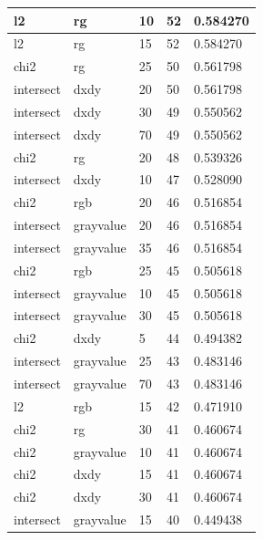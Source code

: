 \documentclass{article}
\begin{document}
\begin{longtable}{|l|l|l|l|l|}
    l2            & rg             & 10       & 52      & 0.584270 \\ \hline 
    l2            & rg             & 15       & 52      & 0.584270 \\ \hline
    chi2          & rg             & 25       & 50      & 0.561798 \\ \hline
    intersect     & dxdy           & 20       & 50      & 0.561798 \\ \hline
    intersect     & dxdy           & 30       & 49      & 0.550562 \\ \hline
    intersect     & dxdy           & 70       & 49      & 0.550562 \\ \hline
    chi2          & rg             & 20       & 48      & 0.539326 \\ \hline
    intersect     & dxdy           & 10       & 47      & 0.528090 \\ \hline
    chi2          & rgb            & 20       & 46      & 0.516854 \\ \hline
    intersect     & grayvalue      & 20       & 46      & 0.516854 \\ \hline
    intersect     & grayvalue      & 35       & 46      & 0.516854 \\ \hline
    chi2          & rgb            & 25       & 45      & 0.505618 \\ \hline
    intersect     & grayvalue      & 10       & 45      & 0.505618 \\ \hline 
    intersect     & grayvalue      & 30       & 45      & 0.505618 \\ \hline
    chi2          & dxdy           & 5        & 44      & 0.494382 \\ \hline
    intersect     & grayvalue      & 25       & 43      & 0.483146 \\ \hline
    intersect     & grayvalue      & 70       & 43      & 0.483146 \\ \hline 
    l2            & rgb            & 15       & 42      & 0.471910 \\ \hline
    chi2          & rg             & 30       & 41      & 0.460674 \\ \hline
    chi2          & grayvalue      & 10       & 41      & 0.460674 \\ \hline
    chi2          & dxdy           & 15       & 41      & 0.460674 \\ \hline
    chi2          & dxdy           & 30       & 41      & 0.460674 \\ \hline
    intersect     & grayvalue      & 15       & 40      & 0.449438 \\ \hline

\end{longtable}
\end{document}

